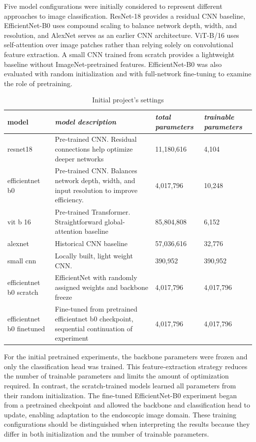\documentclass[conference]{IEEEtran}
\begin{document}
Five model configurations were initially considered to represent different approaches to image classification. ResNet-18 provides a residual CNN baseline, EfficientNet-B0 uses compound scaling to balance network depth, width, and resolution, and AlexNet serves as an earlier CNN architecture. ViT-B/16 uses self-attention over image patches rather than relying solely on convolutional feature extraction. A small CNN trained from scratch provides a lightweight baseline without ImageNet-pretrained features. EfficientNet-B0 was also evaluated with random initialization and with full-network fine-tuning to examine the role of pretraining.

\begin{table}[htbp]
\caption{Initial project's settings}
\begin{center}
\begin{tabular}{|m{4em}|m{10em}|m{4.5em}|m{4.5em}|}
\hline
\textbf{model}&\textit{model description}&\textit{total parameters}&\textit{trainable parameters}\\
\hline
    resnet18 & Pre-trained CNN. Residual connections help optimize deeper networks & 11,180,616 & 4,104 \\
    \hline
    efficientnet b0 & Pre-trained CNN. Balances network depth, width, and input resolution to improve efficiency. & 4,017,796 & 10,248 \\
    \hline
    vit b 16 & Pre-trained Transformer. Straightforward global-attention baseline & 85,804,808 & 6,152 \\
    \hline
    alexnet & Historical CNN baseline & 57,036,616 & 32,776 \\
    \hline
    small cnn & Locally built, light weight CNN. & 390,952 & 390,952 \\
    \hline
    efficientnet b0 scratch & EfficientNet with randomly assigned weights and backbone freeze & 4,017,796 & 4,017,796 \\
    \hline
    efficientnet b0 finetuned & Fine-tuned from pretrained efficientnet b0 checkpoint, sequential continuation of experiment & 4,017,796 & 4,017,796 \\
\hline
\end{tabular}
\label{tables:tab2}
\end{center}
\end{table}

For the initial pretrained experiments, the backbone parameters were frozen and only the classification head was trained. This feature-extraction strategy reduces the number of trainable parameters and limits the amount of optimization required. In contrast, the scratch-trained models learned all parameters from their random initialization. The fine-tuned EfficientNet-B0 experiment began from a pretrained checkpoint and allowed the backbone and classification head to update, enabling adaptation to the endoscopic image domain. These training configurations should be distinguished when interpreting the results because they differ in both initialization and the number of trainable parameters.
\end{document}
